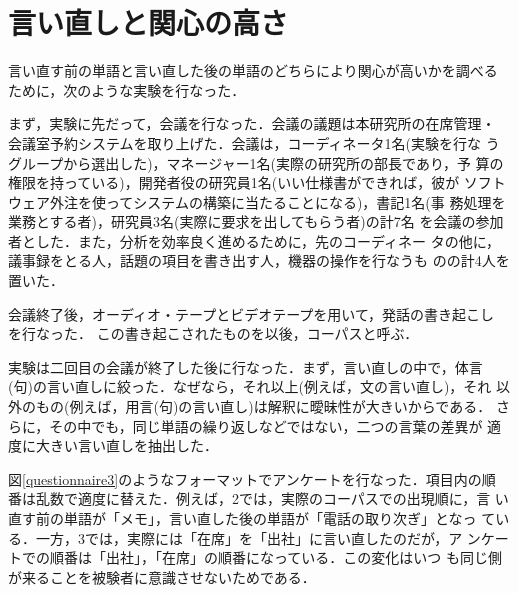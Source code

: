 \section{言い直しと関心の高さ}

言い直す前の単語と言い直した後の単語のどちらにより関心が高いかを調べる
ために，次のような実験を行なった．

まず，実験に先だって，会議を行なった．会議の議題は本研究所の在席管理・
会議室予約システムを取り上げた．会議は，コーディネータ1名(実験を行な
うグループから選出した)，マネージャー1名(実際の研究所の部長であり，予
算の権限を持っている)，開発者役の研究員1名(いい仕様書ができれば，彼が
ソフトウェア外注を使ってシステムの構築に当たることになる)，書記1名(事
務処理を業務とする者)，研究員3名(実際に要求を出してもらう者)の計7名
を会議の参加者とした．また，分析を効率良く進めるために，先のコーディネー
タの他に，議事録をとる人，話題の項目を書き出す人，機器の操作を行なうも
のの計4人を置いた．

会議終了後，オーディオ・テープとビデオテープを用いて，発話の書き起こし
を行なった．
この書き起こされたものを以後，コーパスと呼ぶ．

実験は二回目の会議が終了した後に行なった．まず，言い直しの中で，体言
(句)の言い直しに絞った．なぜなら，それ以上(例えば，文の言い直し)，それ
以外のもの(例えば，用言(句)の言い直し)は解釈に曖昧性が大きいからである．
さらに，その中でも，同じ単語の繰り返しなどではない，二つの言葉の差異が
適度に大きい言い直しを抽出した．

図\ref{questionnaire3}のようなフォーマットでアンケートを行なった．項目内の順
番は乱数で適度に替えた．例えば，2では，実際のコーパスでの出現順に，言
い直す前の単語が「メモ」，言い直した後の単語が「電話の取り次ぎ」となっ
ている．一方，3では，実際には「在席」を「出社」に言い直したのだが，ア
ンケートでの順番は「出社」，「在席」の順番になっている．この変化はいつ
も同じ側が来ることを被験者に意識させないためである．

